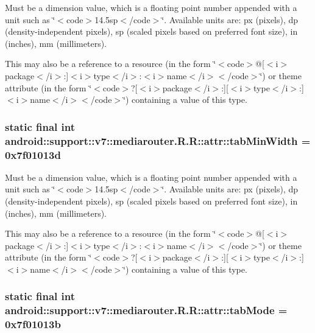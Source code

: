 Must be a dimension value, which is a floating point number appended with a unit such as \char`\"{}$<$code$>$14.5sp$<$/code$>$\char`\"{}. Available units are: px (pixels), dp (density-independent pixels), sp (scaled pixels based on preferred font size), in (inches), mm (millimeters). 

This may also be a reference to a resource (in the form \char`\"{}$<$code$>$@\mbox{[}$<$i$>$package$<$/i$>$:\mbox{]}$<$i$>$type$<$/i$>$:$<$i$>$name$<$/i$>$$<$/code$>$\char`\"{}) or theme attribute (in the form \char`\"{}$<$code$>$?\mbox{[}$<$i$>$package$<$/i$>$:\mbox{]}\mbox{[}$<$i$>$type$<$/i$>$:\mbox{]}$<$i$>$name$<$/i$>$$<$/code$>$\char`\"{}) containing a value of this type. \hypertarget{classandroid_1_1support_1_1v7_1_1mediarouter_1_1_r_1_1attr_720b1be87147d8da957c7c9081780da1}{
\subsubsection[{tabMinWidth}]{\setlength{\rightskip}{0pt plus 5cm}static final int android::support::v7::mediarouter.R.R::attr::tabMinWidth = 0x7f01013d}}
\label{classandroid_1_1support_1_1v7_1_1mediarouter_1_1_r_1_1attr_720b1be87147d8da957c7c9081780da1}


Must be a dimension value, which is a floating point number appended with a unit such as \char`\"{}$<$code$>$14.5sp$<$/code$>$\char`\"{}. Available units are: px (pixels), dp (density-independent pixels), sp (scaled pixels based on preferred font size), in (inches), mm (millimeters). 

This may also be a reference to a resource (in the form \char`\"{}$<$code$>$@\mbox{[}$<$i$>$package$<$/i$>$:\mbox{]}$<$i$>$type$<$/i$>$:$<$i$>$name$<$/i$>$$<$/code$>$\char`\"{}) or theme attribute (in the form \char`\"{}$<$code$>$?\mbox{[}$<$i$>$package$<$/i$>$:\mbox{]}\mbox{[}$<$i$>$type$<$/i$>$:\mbox{]}$<$i$>$name$<$/i$>$$<$/code$>$\char`\"{}) containing a value of this type. \hypertarget{classandroid_1_1support_1_1v7_1_1mediarouter_1_1_r_1_1attr_a46cd6625d323102f8b4d9e7fd8b9cc7}{
\subsubsection[{tabMode}]{\setlength{\rightskip}{0pt plus 5cm}static final int android::support::v7::mediarouter.R.R::attr::tabMode = 0x7f01013b}}
\label{classandroid_1_1support_1_1v7_1_1mediarouter_1_1_r_1_1attr_a46cd6625d323102f8b4d9e7fd8b9cc7}


